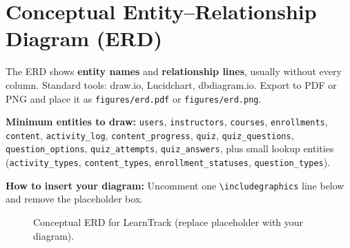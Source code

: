 \section{Conceptual Entity--Relationship Diagram (ERD)}
\label{sec:erd-fig}

The ERD shows \textbf{entity names} and \textbf{relationship lines}, usually without every column. Standard tools: draw.io, Lucidchart, dbdiagram.io. Export to PDF or PNG and place it as \texttt{figures/erd.pdf} or \texttt{figures/erd.png}.

\textbf{Minimum entities to draw:} \texttt{users}, \texttt{instructors}, \texttt{courses}, \texttt{enrollments}, \texttt{content}, \texttt{activity\_log}, \texttt{content\_progress}, \texttt{quiz}, \texttt{quiz\_questions}, \texttt{question\_options}, \texttt{quiz\_attempts}, \texttt{quiz\_answers}, plus small lookup entities (\texttt{activity\_types}, \texttt{content\_types}, \texttt{enrollment\_statuses}, \texttt{question\_types}).

\textbf{How to insert your diagram:} Uncomment one \texttt{\textbackslash includegraphics} line below and remove the placeholder box.

\begin{figure}[htbp]
  \centering
  \caption{Conceptual ERD for LearnTrack (replace placeholder with your diagram).}
  \label{fig:erd}
\end{figure}
